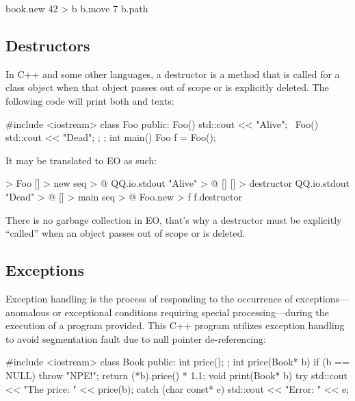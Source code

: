 \documentclass[sigplan,11pt,nonacm,natbib=false]{acmart}
\begin{document}
\begin{ffcode}
book.new 42 > b
b.move 7
b.path
\end{ffcode}

\subsection{Destructors}
\label{sec:destructors}

In C++ and some other languages, a destructor is a method that is called for a class object when that object passes out of scope or is explicitly deleted. The following code will print both  and  texts:

\begin{ffcode}
#include <iostream>
class Foo {
public:
  Foo() { std::cout << "Alive"; }
  ~Foo() { std::cout << "Dead"; };
};
int main() {
  Foo f = Foo();
}
\end{ffcode}

It may be translated to EO as such:

\begin{ffcode}
[] > Foo
  [] > new
    seq > @
      QQ.io.stdout "Alive" > @
      []
        [] > destructor
          QQ.io.stdout "Dead" > @
[] > main
  seq > @
    Foo.new > f
    f.destructor
\end{ffcode}

There is no garbage collection in EO, that's why a destructor must be explicitly ``called'' when an object passes out of scope or is deleted.

\subsection{Exceptions}
\label{sec:exceptions}

Exception handling is the process of responding to the occurrence of exceptions---anomalous or exceptional conditions requiring special processing---during the execution of a program provided. This C++ program utilizes exception handling to avoid segmentation fault due to null pointer de-referencing:

\begin{ffcode}
#include <iostream>
class Book { public: int price(); };
int price(Book* b) {
  if (b == NULL) throw "NPE!";
  return (*b).price() * 1.1;
}
void print(Book* b) {
  try {
    std::cout << "The price: " << price(b);
  } catch (char const* e) {
    std::cout << "Error: " << e;
  }
}
\end{ffcode}
\end{document}
